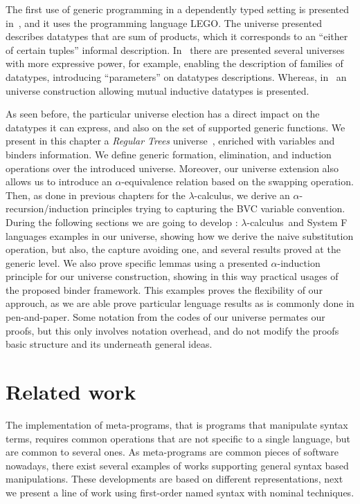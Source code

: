 \documentclass{book}
\newcommand{\alp}{\ensuremath{\alpha}}
\newcommand{\lc}{\ensuremath{\lambda}-calculus}
\begin{document}
The first use of generic programming in a dependently typed setting is presented in~\cite{PfeiferRuess:WGP98}, and it uses the programming language LEGO. The universe presented describes datatypes that are sum of products, which it corresponds to an ``either of certain tuples'' informal description. In~\cite{Dybjer91inductivesets,Bove:2009} there are presented several universes with more expressive power, for example, enabling the description of families of datatypes, introducing ``parameters'' on datatypes descriptions. Whereas, in~\cite{Morris:2004} an universe construction allowing mutual inductive datatypes is presented.

As seen before, the particular universe election has a direct impact on the datatypes it can express, and also on the set of supported generic functions. We present in this chapter a \emph{Regular Trees} universe~\cite{Morris:2004}, enriched with variables and binders information. We define generic formation, elimination, and induction operations over the introduced universe. Moreover, our universe extension also allows us to introduce an \alp-equivalence relation based on the swapping operation. Then, as done in previous chapters for the \lc, we derive an \alp-recursion/induction principles trying to capturing the BVC variable convention. During the following sections we are going to develop : \lc\ and System F languages examples in our universe, showing how we derive the naive substitution operation, but also, the capture avoiding one, and several results proved at the generic level. We also prove specific lemmas using a presented \alp-induction principle for  our universe construction, showing in this way practical usages of the proposed binder framework.  This examples proves the flexibility of our approuch, as we are able prove particular lenguage results as is commonly done in pen-and-paper. Some notation from the codes of our universe permates our proofs, but this only involves notation overhead, and do not modify the proofs basic structure and its underneath general ideas.

\section{Related work} \label{sec:relatedwork}

The implementation of meta-programs, that is programs that manipulate syntax terms, requires common operations that are not specific to a single language, but are common to several ones. As meta-programs are common pieces of software nowadays, there exist several examples of works supporting general syntax based manipulations. These developments are based on different representations, next we present a line of work using first-order named syntax with nominal techniques.
\end{document}

